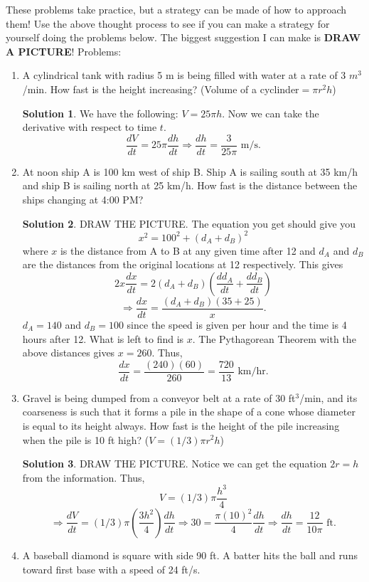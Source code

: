 \documentclass[10pt]{article}
\theoremstyle{Theorem}
\theoremstyle{definition}
\newtheorem*{solution}{Solution}
\theoremstyle{remark}
\theoremstyle{custom}
\begin{document}
These problems take practice, but a strategy can be made of how to approach them! Use the above thought process to see if you can make a strategy for yourself doing the problems below. The biggest suggestion I can make is \textbf{DRAW A PICTURE}!
\newpage
Problems:
\begin{enumerate}[1.]
\item A cylindrical tank with radius 5 m is being filled with water at a rate of 3 $m^3$/min. How fast is the height increasing? (Volume of a cyclinder$=\pi r^2h$)
\begin{solution}
We have the following: $V=25\pi h$. Now we can take the derivative with respect to time $t$.
\[
\dfrac{dV}{dt}=25\pi \dfrac{dh}{dt}\Rightarrow \dfrac{dh}{dt}=\dfrac{3}{25\pi}\text{ m/s}.
\]
\end{solution}
\item At noon ship A is 100 km west of ship B. Ship A is sailing south at 35 km/h and ship B is sailing north at 25 km/h. How fast is the distance between the ships changing at 4:00 PM?
\begin{solution}
DRAW THE PICTURE. The equation you get should give you
\[
x^2=100^2+(d_A+d_B)^2
\]
where $x$ is the distance from A to B at any given time after 12 and $d_A$ and $d_B$ are the distances from the original locations at 12 respectively. This gives
\[
2x\dfrac{dx}{dt}=2(d_A+d_B)\left(\dfrac{dd_A}{dt}+\dfrac{dd_B}{dt}\right)
\]
\[
\Rightarrow \dfrac{dx}{dt}=\dfrac{(d_A+d_B)\left(35+25\right)}{x}.
\]
$d_A=140$ and $d_B=100$ since the speed is given per hour and the time is 4 hours after 12. What is left to find is $x$. The Pythagorean Theorem with the above distances gives $x=260$. Thus,
\[
 \dfrac{dx}{dt}=\dfrac{(240)(60)}{260}=\dfrac{720}{13}\text{ km/hr}.
 \]
\end{solution}
\item Gravel is being dumped from a conveyor belt at a rate of 30 ft$^3$/min, and its coarseness is such that it forms a pile in the shape of a cone whose diameter is equal to its height always. How fast is the height of the pile increasing when the pile is 10 ft high? ($V=(1/3) \pi r^2 h$)
\begin{solution}
DRAW THE PICTURE. Notice we can get the equation $2r=h$ from the information. Thus,
\[
V=(1/3)\pi \dfrac{h^3}{4}
\]
\[
\Rightarrow \dfrac{dV}{dt}=(1/3)\pi \left(\dfrac{3h^2}{4}\right) \dfrac{dh}{dt}\Rightarrow 30=\dfrac{\pi (10)^2}{4}\dfrac{dh}{dt}\Rightarrow \dfrac{dh}{dt}=\dfrac{12}{10\pi}\text{ ft}.
\]
\end{solution}
\item A baseball diamond is square with side 90 ft. A batter hits the ball and runs toward first base with a speed of 24 ft/s.

\end{enumerate}
\end{document}
